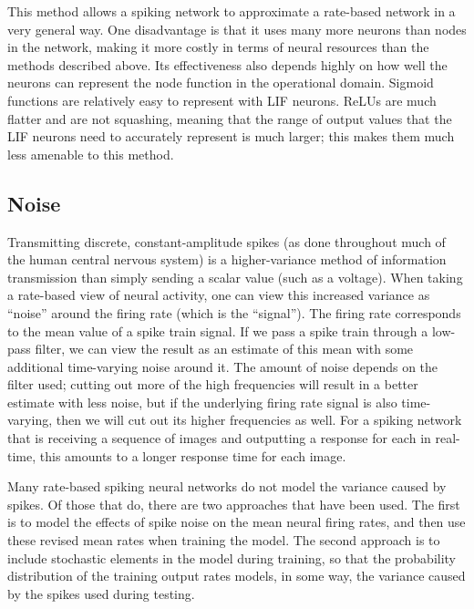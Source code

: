 This method allows a spiking network to approximate a rate-based network
in a very general way.
One disadvantage is that it uses many more neurons than nodes in the network,
making it more costly in terms of neural resources
than the methods described above.
Its effectiveness also depends highly on how well the neurons can represent
the node function in the operational domain.
Sigmoid functions are relatively easy to represent with LIF neurons.
ReLUs are much flatter and are not squashing,
meaning that the range of output values that the LIF neurons
need to accurately represent is much larger;
this makes them much less amenable to this method.


\subsection{Noise}

Transmitting discrete, constant-amplitude spikes
(as done throughout much of the human central nervous system)
is a higher-variance method of information transmission
than simply sending a scalar value (such as a voltage).
When taking a rate-based view of neural activity,
one can view this increased variance as ``noise''
around the firing rate (which is the ``signal'').
The firing rate corresponds to the mean value of a spike train signal.
If we pass a spike train through a low-pass filter,
we can view the result as an estimate of this mean
with some additional time-varying noise around it.
The amount of noise depends on the filter used;
cutting out more of the high frequencies
will result in a better estimate with less noise,
but if the underlying firing rate signal is also time-varying,
then we will cut out its higher frequencies as well.
For a spiking network that is receiving a sequence of images
and outputting a response for each in real-time,
this amounts to a longer response time for each image.

Many rate-based spiking neural networks
do not model the variance caused by spikes.
Of those that do, there are two approaches that have been used.
The first is to model the effects of spike noise on the mean neural firing rates,
and then use these revised mean rates when training the model.
The second approach is to include stochastic elements in the model during training,
so that the probability distribution of the training output rates models,
in some way, the variance caused by the spikes used during testing.

